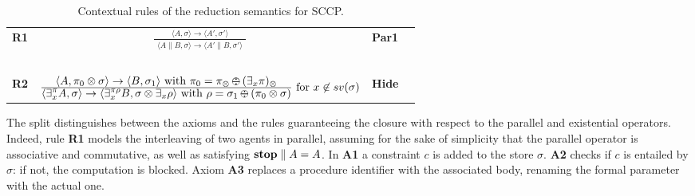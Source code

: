 \documentclass{llncs}
\newcommand{\ostop}{{\bf stop}}
\newcommand{\rarrow}{\rightarrow}
\def\odiv{\, {\ominus\hspace{-7.7pt} \div} \,}
\begin{document}
\begin{table}  %
   \begin{center}
   \begin{tabular}{lcll} 
  \mbox{\bf R1}& $\frac {\displaystyle \langle A, \sigma\rangle \to \langle A', \sigma' \rangle} 
  {\displaystyle \begin{array}{l}
                          \langle A\parallel B, \sigma \rangle \to \langle A'\parallel B, \sigma' \rangle
                          \end{array}}$ 
    & \bf{Par1}&
  \\
  & \mbox{   }&\mbox{   }&
  \\
    \mbox{\bf R2}& $\frac {\displaystyle \langle A, \pi_0 \otimes \sigma \rangle
    \to \langle B, \sigma_1 \rangle \text{ with } \pi_0 = \pi_\otimes \odiv (\exists_x \pi)_\otimes}
    {\displaystyle\langle \exists^{\pi}_x A,\sigma\rangle \to \langle 
    \exists^{\pi \rho}_x B, \sigma \otimes \exists_x \rho
    \rangle \text{ with } \rho = \sigma_1 \odiv (\pi_0 \otimes \sigma)} \text{ for } x \not \in sv(\sigma)$
    &\bf{Hide}&
  \end{tabular}
  \end{center}
\caption{Contextual rules of the reduction semantics for SCCP.}
\label{fig:operational2}
\end{table}

The split distinguishes between the axioms and the rules guaranteeing the closure with respect to the parallel and existential operators. Indeed, rule {\bf  R1} models the interleaving of two agents in parallel, assuming for the sake of simplicity
that the parallel operator is associative and commutative, as well as satisfying $ \hbox{\ostop} \parallel A = A$.
%
%
In {\bf A1} a constraint $c$ is added to the store $\sigma$.
%
{\bf A2} checks if $c$ is entailed by  $\sigma$: if not, the computation is blocked.
%
Axiom {\bf A3} replaces a procedure identifier with the associated body, renaming the formal parameter with the actual one.
%
\end{document}
